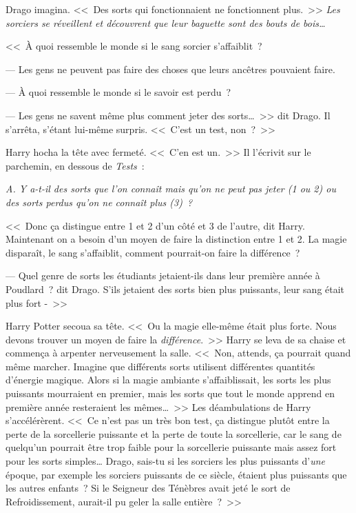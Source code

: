 Drago imagina. <<~Des sorts qui fonctionnaient ne fonctionnent plus.~>> \emph{Les sorciers se réveillent et découvrent que leur baguette sont des bouts de bois…}

<<~À quoi ressemble le monde si le sang sorcier s'affaiblit~?

--- Les gens ne peuvent pas faire des choses que leurs ancêtres pouvaient faire.

--- À quoi ressemble le monde si le savoir est perdu~?

--- Les gens ne savent même plus comment jeter des sorts…~>> dit Drago. Il s'arrêta, s'étant lui-même surpris. <<~C'est un test, non~?~>>

Harry hocha la tête avec fermeté. <<~C'en est un.~>> Il l'écrivit sur le parchemin, en dessous de \emph{Tests}~:

\emph{A. Y a-t-il des sorts que l'on connaît mais qu'on ne peut pas jeter (1 ou 2) ou des sorts perdus qu'on ne connaît plus (3)~?}

<<~Donc ça distingue entre 1 et 2 d'un côté et 3 de l'autre, dit Harry. Maintenant on a besoin d'un moyen de faire la distinction entre 1 et 2. La magie disparaît, le sang s'affaiblit, comment pourrait-on faire la différence~?

--- Quel genre de sorts les étudiants jetaient-ils dans leur première année à Poudlard~? dit Drago. S'ils jetaient des sorts bien plus puissants, leur sang était plus fort -~>>

Harry Potter secoua sa tête. <<~Ou la magie elle-même était plus forte. Nous devons trouver un moyen de faire la \emph{différence}.~>> Harry se leva de sa chaise et commença à arpenter nerveusement la salle. <<~Non, attends, ça pourrait quand même marcher. Imagine que différents sorts utilisent différentes quantités d'énergie magique. Alors si la magie ambiante s'affaiblissait, les sorts les plus puissants mourraient en premier, mais les sorts que tout le monde apprend en première année resteraient les mêmes…~>> Les déambulations de Harry s'accélérèrent. <<~Ce n'est pas un très bon test, ça distingue plutôt entre la perte de la sorcellerie puissante et la perte de toute la sorcellerie, car le sang de quelqu'un pourrait être trop faible pour la sorcellerie puissante mais assez fort pour les sorts simples… Drago, sais-tu si les sorciers les plus puissants d'\emph{une} époque, par exemple les sorciers puissants de ce siècle, étaient plus puissants que les autres enfants~? Si le Seigneur des Ténèbres avait jeté le sort de Refroidissement, aurait-il pu geler la salle entière~?~>>

